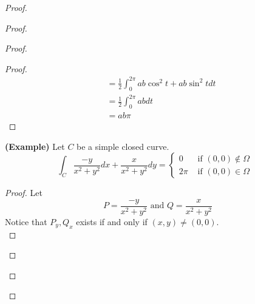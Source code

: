 \documentclass{report}
\begin{document}
\begin{proof}
\begin{proof}
\begin{proof}
\begin{proof}
\begin{align}
&=\frac{1}{2}\int_0^{2\pi} ab\cos^2 t+ab \sin^2 tdt\\
&=\frac{1}{2}\int_0^{2\pi} abdt\\
&=ab\pi
\end{align}
\end{proof}
\begin{theorem}
\label{7.3.11}
\textbf{(Example)} Let $C$ be a simple closed curve.
\begin{equation*}
\int_C \frac{-y}{x^2+y^2}dx+\frac{x}{x^2+y^2} dy=\begin{cases}
  0& \text{ if  }(0,0)\not\in \Omega\\
  2\pi& \text{ if $(0,0)\in \Omega$ }
\end{cases}
\end{equation*}
\end{theorem}
\begin{proof}
Let 
\begin{equation*}
P=\frac{-y}{x^2+y^2}\text{ and }Q=\frac{x}{x^2+y^2}
\end{equation*}
Notice that $P_y,Q_x$ exists if and only if $(x,y)\neq (0,0)$.\\



\end{proof}
\end{proof}
\end{proof}
\end{proof}
\end{document}

